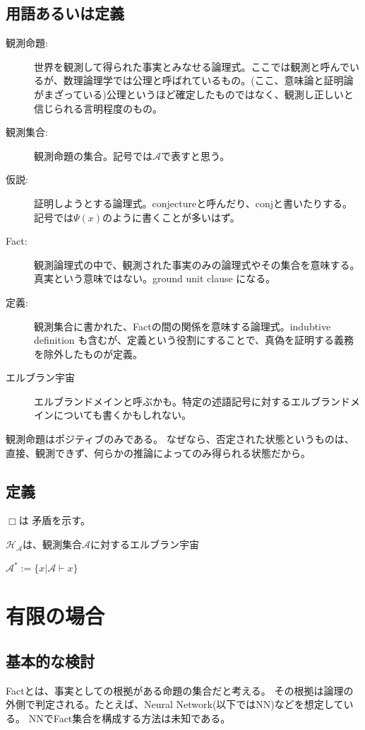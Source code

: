 \documentclass[10pt, oneside]{jarticle}   	%
\theoremstyle{definition}
\newcommand{\cont}{\Box}
\newcommand{\clos}[1]{\mathcal{#1}^{*}}
\begin{document}
\subsection{用語あるいは定義}
\begin{description}
\item[観測命題:] 世界を観測して得られた事実とみなせる論理式。ここでは観測と呼んでいるが、数理論理学では公理と呼ばれているもの。(ここ、意味論と証明論がまざっている)公理というほど確定したものではなく、観測し正しいと信じられる言明程度のもの。
\item[観測集合:] 観測命題の集合。記号では$\mathcal{A}$で表すと思う。
\item[仮説:] 証明しようとする論理式。conjectureと呼んだり、conjと書いたりする。記号では$\Psi(x)$のように書くことが多いはず。
\item[Fact:] 観測論理式の中で、観測された事実のみの論理式やその集合を意味する。真実という意味ではない。ground unit clause になる。
\item[定義:] 観測集合に書かれた、Factの間の関係を意味する論理式。indubtive definition も含むが、定義という役割にすることで、真偽を証明する義務を除外したものが定義。
\item[エルブラン宇宙] エルブランドメインと呼ぶかも。特定の述語記号に対するエルブランドメインについても書くかもしれない。
\end{description}


観測命題はポジティブのみである。
なぜなら、否定された状態というものは、直接、観測できず、何らかの推論によってのみ得られる状態だから。


\subsection{定義}

$\cont$は 矛盾を示す。

$\mathcal{H_{\mathcal{A}}}$は、観測集合$\mathcal{A}$に対するエルブラン宇宙

$\clos{A} := \{x | \mathcal{A} \vdash x\}$



\newpage

\section{有限の場合}
\subsection{基本的な検討}
Factとは、事実としての根拠がある命題の集合だと考える。
その根拠は論理の外側で判定される。たとえば、Neural Network(以下ではNN)などを想定している。
NNでFact集合を構成する方法は未知である。
\end{document}
